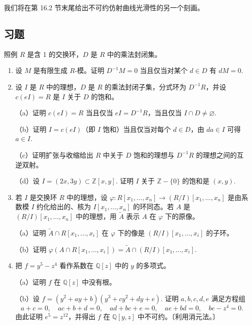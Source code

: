 我们将在第 16.2 节末尾给出不可约仿射曲线光滑性的另一个刻画。

\subsection*{习题}

照例 \(R\) 是含 1 的交换环，\(D\) 是 \(R\) 中的乘法封闭集。

\begin{enumerate}
\item 设 \(M\) 是有限生成 \(R\)-模。证明 \(D^{-1}M = 0\) 当且仅当对某个 \(d \in D\) 有 \(dM = 0\).

\item 设 \(I\) 是 \(R\) 中的理想，\(D\) 是 \(R\) 的乘法封闭子集，分式环为 \(D^{-1}R\)，并设 \(c(eI) = R\) 是 \(I\) 关于 \(D\) 的饱和。

（a）证明 \(c(eI) = R\) 当且仅当 \(eI = D^{-1}R\)，当且仅当 \(I \cap D \neq \varnothing\).

（b）证明 \(I = c(eI)\)（即 \(I\) 饱和）当且仅当对每个 \(d \in D\)，由 \(da \in I\) 可得 \(a \in I\).

（c）证明扩张与收缩给出 \(R\) 中关于 \(D\) 饱和的理想与 \(D^{-1}R\) 的理想之间的互逆双射。

（d）设 \(I = (2x, 3y) \subset \mathbb{Z}[x,y]\). 证明 \(I\) 关于 \(\mathbb{Z}-\{0\}\) 的饱和是 \((x,y)\).

\item 若 \(I\) 是交换环 \(R\) 中的理想，设 \(\varphi : R[x_1, \ldots, x_n] \to (R/I)[x_1, \ldots, x_n]\) 是由系数模 \(I\) 约化给出的、核为 \(I[x_1, \ldots, x_n]\) 的环同态。若 \(A\) 是 \((R/I)[x_1, \ldots, x_n]\) 中的理想，用 \(\tilde A\) 表示 \(A\) 在 \(\varphi\) 下的原像。

（a）证明 \(\tilde A \cap R[x_1, \ldots, x_i]\) 在 \(\varphi\) 下的像是 \((R/I)[x_1, \ldots, x_i]\) 的子环。

（b）证明 \(\varphi(A \cap R[x_1, \ldots, x_i]) = \tilde A \cap (R/I)[x_1, \ldots, x_i]\).

\item 把 \(f = y^5-z^4\) 看作系数在 \(\mathbb{Q}[z]\) 中的 \(y\) 的多项式。

（a）证明 \(f\) 在 \(\mathbb{Q}[z]\) 中没有根。

（b）设 \(f = (y^2+ay+b)(y^3+cy^2+dy+e)\). 证明 \(a, b, c, d, e\) 满足方程组
\[
a+c = 0, \quad ac+b+d = 0, \quad ad+bc+e = 0, \quad ae+bd = 0, \quad be-z^4 = 0.
\]
由此证明 \(e^5 = z^{12}\)，并得出 \(f\) 在 \(\mathbb{Q}[y,z]\) 中不可约。〔利用消元法。〕


\end{enumerate}
